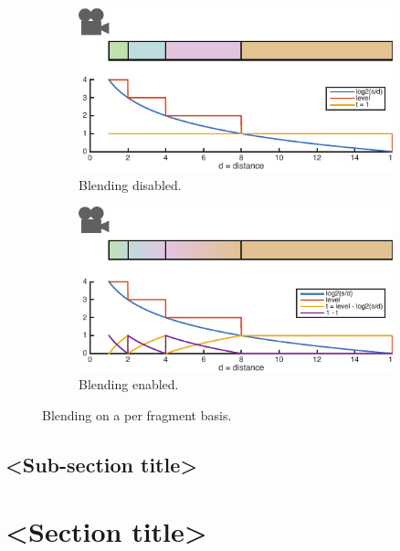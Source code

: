 \begin{figure}[htbp]
    \centering
    \begin{subfigure}[tb]{0.49\textwidth}
    	\includegraphics[width=\textwidth]{figures/implementation/rendering/blending1.pdf}
	\caption{Blending disabled.}
    \end{subfigure}
    \begin{subfigure}[tb]{0.49\textwidth}
    	\includegraphics[width=\textwidth]{figures/implementation/rendering/blending2.pdf}
	\caption{Blending enabled.}
    \end{subfigure}
    \caption{Blending on a per fragment basis.}
    \label{fig:blending}
\end{figure}

\subsection{<Sub-section title>}

\section{<Section title>}

